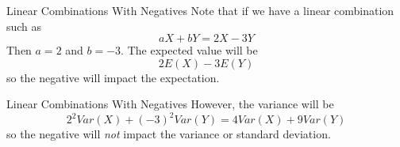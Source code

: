 \begin{frame}{Linear Combinations With Negatives}
    Note that if we have a linear combination such as
    \[
    aX + bY = 2X - 3Y
    \]
    Then $a=2$ and $b=-3$. The expected value will be 
    \[
    2E(X) -3E(Y)
    \]
    so the negative will impact the expectation.
\end{frame}

\begin{frame}{Linear Combinations With Negatives}
    However, the variance will be 
    \[
        2^2Var(X) + (-3)^2Var(Y) = 4Var(X) + 9Var(Y)
    \]
    so the negative will \textit{not} impact the variance or standard deviation.
\end{frame}